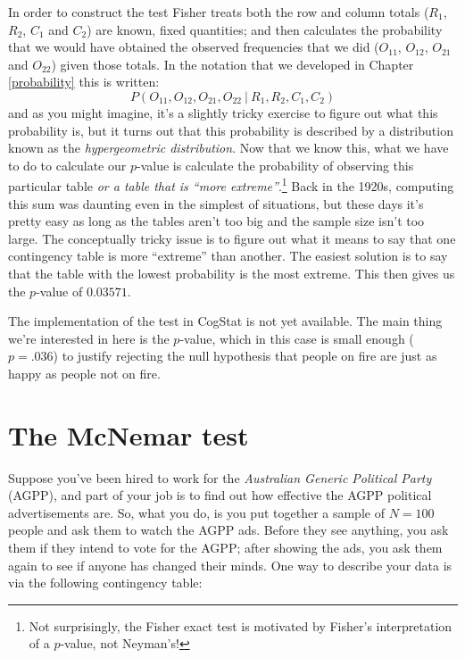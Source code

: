 \documentclass[
]{book}
\theoremstyle{definition}
\theoremstyle{definition}
\theoremstyle{definition}
\theoremstyle{definition}
\theoremstyle{remark}
\begin{document}
In order to construct the test Fisher treats both the row and column totals (\(R_1\), \(R_2\), \(C_1\) and \(C_2\)) are known, fixed quantities; and then calculates the probability that we would have obtained the observed frequencies that we did (\(O_{11}\), \(O_{12}\), \(O_{21}\) and \(O_{22}\)) given those totals. In the notation that we developed in Chapter \ref{probability} this is written:
\[
P(O_{11}, O_{12}, O_{21}, O_{22} \ | \ R_1, R_2, C_1, C_2) 
\]
and as you might imagine, it's a slightly tricky exercise to figure out what this probability is, but it turns out that this probability is described by a distribution known as the \emph{hypergeometric distribution}. Now that we know this, what we have to do to calculate our \(p\)-value is calculate the probability of observing this particular table \emph{or a table that is ``more extreme''}.\footnote{Not surprisingly, the Fisher exact test is motivated by Fisher's interpretation of a \(p\)-value, not Neyman's!} Back in the 1920s, computing this sum was daunting even in the simplest of situations, but these days it's pretty easy as long as the tables aren't too big and the sample size isn't too large. The conceptually tricky issue is to figure out what it means to say that one contingency table is more ``extreme'' than another. The easiest solution is to say that the table with the lowest probability is the most extreme. This then gives us the \(p\)-value of \(0.03571\).

The implementation of the test in CogStat is not yet available. The main thing we're interested in here is the \(p\)-value, which in this case is small enough (\(p=.036\)) to justify rejecting the null hypothesis that people on fire are just as happy as people not on fire.

\hypertarget{mcnemar}{%
\section{The McNemar test}\label{mcnemar}}

Suppose you've been hired to work for the \emph{Australian Generic Political Party} (AGPP), and part of your job is to find out how effective the AGPP political advertisements are. So, what you do, is you put together a sample of \(N=100\) people and ask them to watch the AGPP ads. Before they see anything, you ask them if they intend to vote for the AGPP; after showing the ads, you ask them again to see if anyone has changed their minds. One way to describe your data is via the following contingency table:
\end{document}
